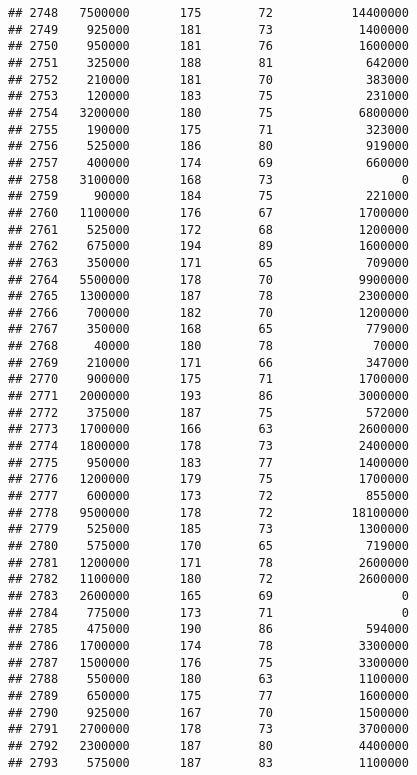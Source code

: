 \documentclass[
]{article}
\begin{document}
\begin{verbatim}
## 2748   7500000       175        72           14400000
## 2749    925000       181        73            1400000
## 2750    950000       181        76            1600000
## 2751    325000       188        81             642000
## 2752    210000       181        70             383000
## 2753    120000       183        75             231000
## 2754   3200000       180        75            6800000
## 2755    190000       175        71             323000
## 2756    525000       186        80             919000
## 2757    400000       174        69             660000
## 2758   3100000       168        73                  0
## 2759     90000       184        75             221000
## 2760   1100000       176        67            1700000
## 2761    525000       172        68            1200000
## 2762    675000       194        89            1600000
## 2763    350000       171        65             709000
## 2764   5500000       178        70            9900000
## 2765   1300000       187        78            2300000
## 2766    700000       182        70            1200000
## 2767    350000       168        65             779000
## 2768     40000       180        78              70000
## 2769    210000       171        66             347000
## 2770    900000       175        71            1700000
## 2771   2000000       193        86            3000000
## 2772    375000       187        75             572000
## 2773   1700000       166        63            2600000
## 2774   1800000       178        73            2400000
## 2775    950000       183        77            1400000
## 2776   1200000       179        75            1700000
## 2777    600000       173        72             855000
## 2778   9500000       178        72           18100000
## 2779    525000       185        73            1300000
## 2780    575000       170        65             719000
## 2781   1200000       171        78            2600000
## 2782   1100000       180        72            2600000
## 2783   2600000       165        69                  0
## 2784    775000       173        71                  0
## 2785    475000       190        86             594000
## 2786   1700000       174        78            3300000
## 2787   1500000       176        75            3300000
## 2788    550000       180        63            1100000
## 2789    650000       175        77            1600000
## 2790    925000       167        70            1500000
## 2791   2700000       178        73            3700000
## 2792   2300000       187        80            4400000
## 2793    575000       187        83            1100000

\end{verbatim}
\end{document}
